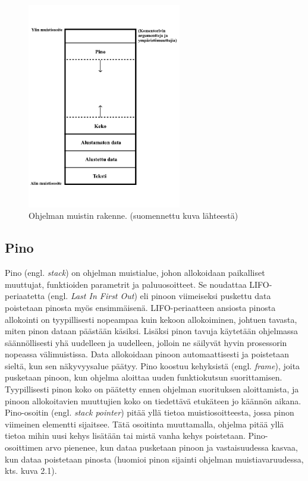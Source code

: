 \begin{figure}[tbh]
{\begin{centering}
\includegraphics[width=0.6\textwidth]{kuvat/muistin_rakenne.pdf}
\par\end{centering}}
\caption{Ohjelman muistin rakenne.\cite{mmic2010} (suomennettu kuva lähteestä)}
\end{figure}

\subsection{Pino}

Pino (engl. \textit{stack}) on ohjelman muistialue, johon allokoidaan paikalliset muuttujat, funktioiden parametrit ja paluuosoitteet. Se noudattaa LIFO-periaatetta (engl. \textit{Last In First Out}) eli pinoon viimeiseksi puskettu data poistetaan pinosta myös ensimmäisenä. LIFO-periaatteen ansiosta pinosta allokointi on tyypillisesti nopeampaa kuin kekoon allokoiminen, johtuen tavasta, miten pinon dataan päästään käsiksi. Lisäksi pinon tavuja käytetään ohjelmassa säännöllisesti yhä uudelleen ja uudelleen, jolloin ne säilyvät hyvin prosessorin nopeassa välimuistissa. Data allokoidaan pinoon automaattisesti ja poistetaan sieltä, kun sen näkyvyysalue päätyy. Pino koostuu kehyksistä (engl. \textit{frame}), joita pusketaan pinoon, kun ohjelma aloittaa uuden funktiokutsun suorittamisen. Tyypillisesti pinon koko on päätetty ennen ohjelman suorituksen aloittamista, ja pinoon allokoitavien muuttujien koko on tiedettävä etukäteen jo käännön aikana.\cite{mmic2010}
Pino-osoitin (engl. \textit{stack pointer}) pitää yllä tietoa muistiosoitteesta, jossa pinon viimeinen elementti sijaitsee. Tätä osoitinta muuttamalla, ohjelma pitää yllä tietoa mihin uusi kehys lisätään tai mistä vanha kehys poistetaan. Pino-osoittimen arvo pienenee, kun dataa pusketaan pinoon ja vastaisuudessa kasvaa, kun dataa poistetaan pinosta (huomioi pinon sijainti ohjelman muistiavaruudessa, kts. kuva 2.1).\cite{sasp2006}

